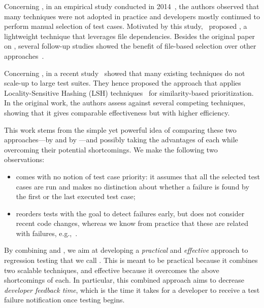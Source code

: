 Concerning \tcs, in an empirical study conducted in 2014~\cite{gligoric_empirical}, the authors observed that many techniques were not adopted in practice and developers mostly continued to perform manual selection of test cases.  
Motivated by this study,~\citet{gligoricEk} proposed  \ek,  a lightweight \tcs technique that leverages file dependencies.
Besides the original paper on \ek, several follow-up studies showed the benefit of file-based selection over other approaches~\cite{legunsen2016, zhang_hybrid_2018}.

Concerning \tcp, in a recent study~\citet{miranda_fast_2018} showed that many existing techniques do not scale-up to large test suites.
They hence proposed the \fs approach that applies Locality-Sensitive Hashing (LSH) techniques~\cite{Leskovec:2014} for similarity-based prioritization.
In the original work, the authors assess \fs against several competing \tcp techniques, showing that it gives comparable effectiveness but with higher efficiency.

This work stems from the simple yet powerful idea of comparing these two approaches---\tcs by \ek and \tcp by \fs---and possibly taking the advantages of each while overcoming their potential shortcomings. 
%
We make the following two observations:
\begin{itemize}
\item \ek comes with no notion of test case priority: it assumes that all the selected test cases are run and makes no distinction about whether a failure is found by the first or the last executed test case;
\item \fs reorders tests with the goal to detect failures early, but does not consider recent code changes, whereas we know from practice that these are related with failures, e.g.,~\cite{knauss2015supporting,elbaum2014techniques}.
\end{itemize}

By combining \ek and \fs, we  aim at developing 
a \textit{practical} and \textit{effective} approach to regression testing that we call \emph{\fz}.
This is meant to be practical because it combines two scalable techniques, and effective because it overcomes the above shortcomings of each.
In particular, this combined approach aims to decrease \textit{developer feedback time}, which is the time it takes for a developer to receive a test failure notification once testing begins.

